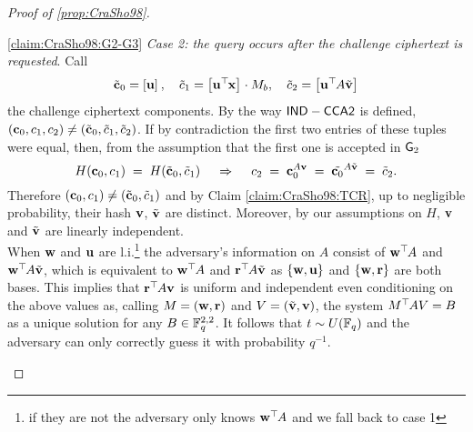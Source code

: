 \begin{proof}[Proof of \ref{prop:CraSho98}]
\begin{claimproof}{\ref{claim:CraSho98:G2-G3}}
	\textit{Case 2: the query occurs after the challenge ciphertext is requested}. Call
	\[
		\tilde{\mathbf{c}}_0 = \left[{\mathbf{u}}\right]_{}
			, \quad
		\tilde{c}_1 = \left[{\mathbf{u}^\top\hspace{-.1em} \mathbf{x}}\right]_{} \cdot M_b
			, \quad
		\tilde{c}_2 = \left[{\mathbf{u}^\top\hspace{-.1em} A \tilde{\mathbf{v}}}\right]_{}
	\]
	the challenge ciphertext components. By the way $\mathsf{IND-CCA2}$ is defined, $(\mathbf{c}_0, c_1, c_2) \neq (\tilde{\mathbf{c}}_0, \tilde{c}_1, \tilde{c}_2)$. If by contradiction the first two entries of these tuples were equal, then, from the assumption that the first one is accepted in $\mathsf{G}_2$
	\[
		H(\mathbf{c}_0, c_1)
			\; = \;
		H(\tilde{\mathbf{c}}_0, \tilde{c}_1)
			\quad \: \Rightarrow \: \quad
		c_2
			\; = \;
		\mathbf{c}_0^{A \mathbf{v}}
			\; = \;
		\tilde{\mathbf{c}_0}^{A \tilde{\mathbf{v}}}
			\; = \;
		\tilde{c}_2.
	\]
	Therefore $(\mathbf{c}_0, c_1) \neq (\tilde{\mathbf{c}}_0, \tilde{c}_1)$ and by Claim \ref{claim:CraSho98:TCR}, up to negligible probability, their hash $\mathbf{v}$, $\tilde{\mathbf{v}}$ are distinct. Moreover, by our assumptions on $H$, $\mathbf{v}$ and $\tilde{\mathbf{v}}$ are linearly independent.\\
	When $\mathbf{w}$ and $\mathbf{u}$ are l.i.\footnote{if they are not the adversary only knows $\mathbf{w}^\top\hspace{-.1em} A$ and we fall back to case 1} the adversary's information on $A$ consist of $\mathbf{w}^\top\hspace{-.1em} A$ and $\mathbf{w}^\top\hspace{-.1em} A \tilde{\mathbf{v}}$, which is equivalent to $\mathbf{w}^\top\hspace{-.1em} A$ and $\mathbf{r}^\top\hspace{-.1em} A \tilde{\mathbf{v}}$ as $\{\mathbf{w}, \mathbf{u}\}$ and $\{\mathbf{w}, \mathbf{r}\}$ are both bases.
	This implies that $\mathbf{r}^\top\hspace{-.1em} A \mathbf{v}$ is uniform and independent even conditioning on the above values as, calling $M = (\mathbf{w}, \mathbf{r})$ and $V = (\tilde{\mathbf{v}}, \mathbf{v})$, the system $M^\top\hspace{-.1em} A V = B$ as a unique solution for any $B \in \mathbb{F}_q^{2, 2}$. It follows that $t \sim U(\mathbb{F}_q)$ and the adversary can only correctly guess it with probability $q^{-1}$.
	
	\end{claimproof}
	

\end{proof}